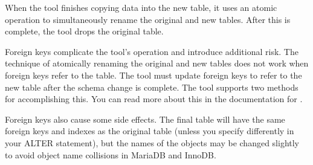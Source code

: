 \documentclass[letterpaper,10pt,english]{sphinxmanual}
\begin{document}
When the tool finishes copying data into the new table, it uses an atomic
 operation to simultaneously rename the original and new tables.
After this is complete, the tool drops the original table.

Foreign keys complicate the tool’s operation and introduce additional risk.  The
technique of atomically renaming the original and new tables does not work when
foreign keys refer to the table. The tool must update foreign keys to refer to
the new table after the schema change is complete. The tool supports two methods
for accomplishing this. You can read more about this in the documentation for
{\hyperref[\detokenize{mariadb-schema-change:cmdoption-mariadb-schema-change-alter-foreign-keys-method}]{}}.

Foreign keys also cause some side effects. The final table will have the same
foreign keys and indexes as the original table (unless you specify differently
in your ALTER statement), but the names of the objects may be changed slightly
to avoid object name collisions in MariaDB and InnoDB.
\end{document}
